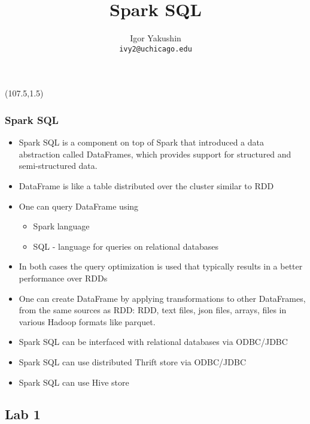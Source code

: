 \documentclass{beamer}
\title{\huge{Spark SQL}}
\author{Igor Yakushin \\ \texttt{ivy2@uchicago.edu}}
\newcommand{\SPARK}{
\begin{textblock}{14}(107.5,1.5)
  \pgfuseimage{spark}
\end{textblock}
}
\begin{document}



\begin{frame}
\SPARK
\titlepage
\end{frame}

\begin{frame}[fragile]
  \frametitle{Spark SQL}
  
  \begin{itemize}
  \item {\color{mycolordef}Spark SQL} is a component on top of Spark that introduced a data abstraction called {\color{mycolordef}DataFrames}, which provides support for structured and semi-structured data. 
  \item DataFrame is like a table distributed over the cluster similar to RDD
  \item One can query DataFrame using 
    \begin{itemize}
    \item Spark language
    \item SQL - language for queries on relational databases
    \end{itemize}
  \item In both cases the query optimization is used that typically results in a better performance over RDDs
  \item One can create DataFrame by applying transformations to other DataFrames, from the same sources as RDD: RDD, text files, json files, arrays, files in various Hadoop formats like parquet.
  \item Spark SQL can be interfaced with relational databases via ODBC/JDBC
  \item Spark SQL can use distributed Thrift store via ODBC/JDBC
  \item Spark SQL can use Hive store
  \end{itemize}
\end{frame}

\subsection{Lab 1}
\end{document}

